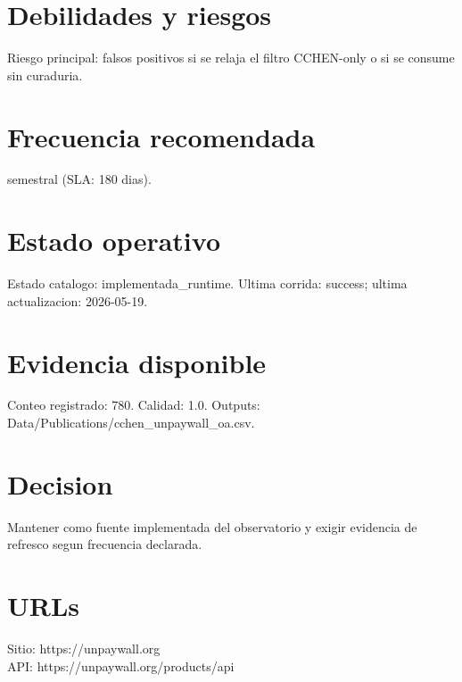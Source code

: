 \documentclass[10pt,a4paper]{article}
\begin{document}
\section*{Debilidades y riesgos}
Riesgo principal: falsos positivos si se relaja el filtro CCHEN-only o si se consume sin curaduria.

\section*{Frecuencia recomendada}
semestral (SLA: 180 dias).

\section*{Estado operativo}
Estado catalogo: implementada\_runtime. Ultima corrida: success; ultima actualizacion: 2026-05-19.

\section*{Evidencia disponible}
Conteo registrado: 780. Calidad: 1.0. Outputs: Data/Publications/cchen\_unpaywall\_oa.csv.

\section*{Decision}
Mantener como fuente implementada del observatorio y exigir evidencia de refresco segun frecuencia declarada.


\section*{URLs}
Sitio: https://unpaywall.org\\
API: https://unpaywall.org/products/api
\end{document}
